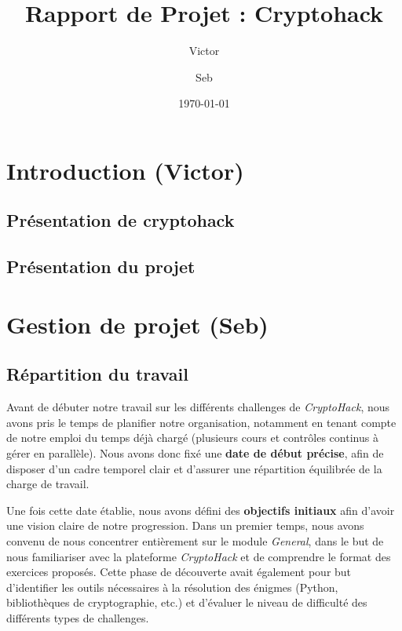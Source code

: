 \documentclass[12pt, a4paper]{article}
\title{Rapport de Projet : Cryptohack}
\author{Victor \and Seb}
\date{\today} %
\begin{document}
\maketitle

\tableofcontents

\newpage %


\section{Introduction (Victor)}
    \subsection{Présentation de cryptohack}
    
    \subsection{Présentation du projet}

\section{Gestion de projet (Seb)}
    \subsection{Répartition du travail}
    Avant de débuter notre travail sur les différents challenges de \textit{CryptoHack}, nous avons pris le temps de planifier notre organisation, notamment en tenant compte de notre emploi du temps déjà chargé (plusieurs cours et contrôles continus à gérer en parallèle). Nous avons donc fixé une \textbf{date de début précise}, afin de disposer d’un cadre temporel clair et d’assurer une répartition équilibrée de la charge de travail.

    Une fois cette date établie, nous avons défini des \textbf{objectifs initiaux} afin d’avoir une vision claire de notre progression. Dans un premier temps, nous avons convenu de nous concentrer entièrement sur le module \textit{General}, dans le but de nous familiariser avec la plateforme \textit{CryptoHack} et de comprendre le format des exercices proposés. Cette phase de découverte avait également pour but d’identifier les outils nécessaires à la résolution des énigmes (Python, bibliothèques de cryptographie, etc.) et d’évaluer le niveau de difficulté des différents types de challenges.
\end{document}
